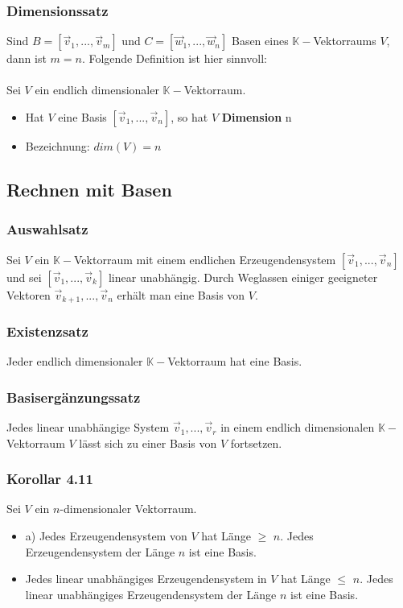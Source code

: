 \documentclass[titlepage]{article}
\newcommand{\K}{\mathbb{K}}
\newcommand{\1}{\mathbb{1}}
\newcommand{\0}{\mathbb{0}}
\begin{document}
				\subsubsection{Dimensionssatz}
					Sind $B=[\vec{v}_1,...,\vec{v}_m]$ und $C=[\vec{w}_1,...,\vec{w}_n]$ Basen eines $\K-$Vektorraums $V$, dann ist $m=n$. Folgende Definition ist hier sinnvoll:\\\\
					Sei $V$ ein endlich dimensionaler $\K-$Vektorraum.
					\begin{itemize}
						\item Hat $V$ eine Basis $[\vec{v}_1,...,\vec{v}_n]$, so hat $V$ \textbf{Dimension} n
						\item Bezeichnung: $dim(V)=n$
					\end{itemize}
			\subsection{Rechnen mit Basen}
				\subsubsection{Auswahlsatz}
					Sei $V$ ein $\K-$Vektorraum mit einem endlichen Erzeugendensystem $[\vec{v}_1,...,\vec{v}_n]$ und sei $[\vec{v}_1,...,\vec{v}_k]$ linear unabhängig. Durch Weglassen einiger geeigneter Vektoren $\vec{v}_{k+1},...,\vec{v}_n$ erhält man eine Basis von $V$.
				\subsubsection{Existenzsatz}
					Jeder endlich dimensionaler $\K-$Vektorraum hat eine Basis.
				\subsubsection{Basisergänzungssatz}
					Jedes linear unabhängige System $\vec{v}_1,...,\vec{v}_r$ in einem endlich dimensionalen $\K-$Vektorraum $V$ lässt sich zu einer Basis von $V$ fortsetzen.
				\subsubsection{Korollar 4.11}
					Sei $V$ ein $n$-dimensionaler Vektorraum.
					\begin{itemize}
						\item a) Jedes Erzeugendensystem von $V$ hat Länge $\ge$ $n$. Jedes Erzeugendensystem der Länge $n$ ist eine Basis.
						\item Jedes linear unabhängiges Erzeugendensystem in $V$ hat Länge $\le$ $n$. Jedes linear unabhängiges Erzeugendensystem der Länge $n$ ist eine Basis.
					\end{itemize}
\end{document}
